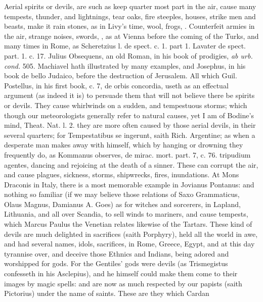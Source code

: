 {{Aerial spirits or devils, are such as keep quarter most part in the
air, cause many tempests, thunder, and lightnings, tear oaks,
fire steeples, houses, strike men and beasts, make it rain stones, as
in Livy's time, wool, frogs, \etc{}. Counterfeit armies in the air, strange
noises, swords, \etc{}, as at Vienna before the coming of the Turks, and
many times in Rome, as Scheretzius l. de spect. c. 1. part 1. Lavater
de spect. part. 1. c. 17. Julius Obsequens, an old Roman, in his book
of prodigies, \emph{ab urb. cond.} 505. Machiavel hath illustrated by
many examples, and Josephus, in his book de bello Judaico, before the
destruction of Jerusalem. All which Guil. Postellus, in his first book,
c. 7, \textlatin{de orbis concordia}, useth as an effectual argument (as indeed it
is) to persuade them that will not believe there be spirits or devils.
They cause whirlwinds on a sudden, and tempestuous storms; which though
our meteorologists generally refer to natural causes, yet I am of
Bodine's mind, Theat. Nat. l. 2. they are more often caused by those
aerial devils, in their several quarters; for Tempestatibus se
ingerunt, saith  Rich. Argentine; as when a desperate man makes
away with himself, which by hanging or drowning they frequently do, as
Kommanus observes, \textlatin{de mirac. mort. part. 7, c. 76. tripudium agentes},
dancing and rejoicing at the death of a sinner. These can corrupt the
air, and cause plagues, sickness, storms, shipwrecks, fires,
inundations. At Mons Draconis in Italy, there is a most memorable
example in Jovianus Pontanus: and nothing so familiar (if we may
believe those relations of \textlatin{Saxo Grammaticus, Olaus Magnus, Damianus} A.
Goes) as for witches and sorcerers, in Lapland, Lithuania, and all over
Scandia, to sell winds to mariners, and cause tempests, which Marcus
Paulus the Venetian relates likewise of the Tartars. These kind of
devils are much delighted in sacrifices (saith Porphyry), held
all the world in awe, and had several names, idols, sacrifices, in
Rome, Greece, Egypt, and at this day tyrannise over, and deceive those
Ethnics and Indians, being adored and worshipped for gods. For
the Gentiles' gods were devils (as \textlatin{Trismegistus} confesseth in his
Asclepius), and he himself could make them come to their images by
magic spells: and are now as much respected by our papists (saith
Pictorius) under the name of saints. These are they which Cardan
}}
